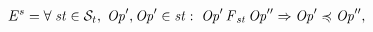 \documentclass[acmlarge, ,11pt]{acmart}
\begin{document}
\begin{align}\label{eqn:Causal}
\begin{split}
E^{s} = \forall \; \mathit{st} \in \mathcal{S}_t, \; {\mathit{Op}}', {\mathit{Op}}' \in \mathit{st} : \; {\mathit{Op}}' \operatorname{\it F}_\mathit{st} {\mathit{Op}}''
 \Rightarrow {\mathit{Op}}' \preccurlyeq {\mathit{Op}}'' ,
 \end{split}
  \end{align} %
\end{document}
